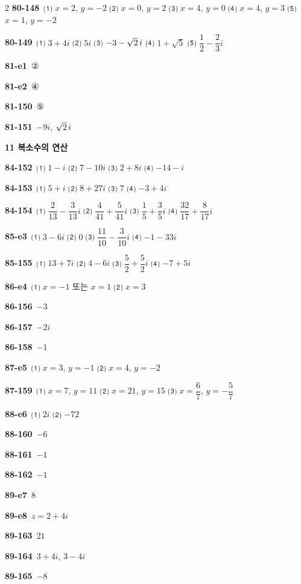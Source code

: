 \documentclass[10pt,a4paper]{article}
\begin{document}
\begin{multicols}{2}
\noindent\textbf{80-148}\ ⑴ $x=2$, $y=-2$ ⑵ $x=0$, $y=2$ ⑶ $x=4$, $y=0$ ⑷ $x=4$, $y=3$ ⑸ $x=1$, $y=-2$\par
\noindent\textbf{80-149}\ ⑴ $3+4i$ ⑵ $5i$ ⑶ $-3-\sqrt{2}\mkern3mu i$ ⑷ $1+\sqrt{5}$ ⑸ $\dfrac{1}{2}-\dfrac{2}{3}i$\par
\noindent\textbf{81-e1}\ ②\par
\noindent\textbf{81-e2}\ ④\par
\noindent\textbf{81-150}\ ⑤\par
\noindent\textbf{81-151}\ $-9i$, $\sqrt{2}\mkern3mu i$\par
\noindent\textbf{11 복소수의 연산}\par\smallskip
\noindent\textbf{84-152}\ ⑴ $1-i$ ⑵ $7-10i$ ⑶ $2+8i$ ⑷ $-14-i$\par
\noindent\textbf{84-153}\ ⑴ $5+i$ ⑵ $8+27i$ ⑶ $7$ ⑷ $-3+4i$\par
\noindent\textbf{84-154}\ ⑴ $\dfrac{2}{13}-\dfrac{3}{13}i$ ⑵ $\dfrac{4}{41}+\dfrac{5}{41}i$ ⑶ $\dfrac{1}{5}+\dfrac{3}{5}i$ ⑷ $\dfrac{32}{17}+\dfrac{8}{17}i$\par
\noindent\textbf{85-e3}\ ⑴ $3-6i$ ⑵ $0$ ⑶ $\dfrac{11}{10}-\dfrac{3}{10}i$ ⑷ $-1-33i$\par
\noindent\textbf{85-155}\ ⑴ $13+7i$ ⑵ $4-6i$ ⑶ $\dfrac{5}{2}+\dfrac{5}{2}i$ ⑷ $-7+5i$\par
\noindent\textbf{86-e4}\ ⑴ $x=-1$ 또는 $x=1$ ⑵ $x=3$\par
\noindent\textbf{86-156}\ $-3$\par
\noindent\textbf{86-157}\ $-2i$\par
\noindent\textbf{86-158}\ $-1$\par
\noindent\textbf{87-e5}\ ⑴ $x=3$, $y=-1$ ⑵ $x=4$, $y=-2$\par
\noindent\textbf{87-159}\ ⑴ $x=7$, $y=11$ ⑵ $x=21$, $y=15$ ⑶ $x=\dfrac{6}{7}$, $y=-\dfrac{5}{7}$\par
\noindent\textbf{88-e6}\ ⑴ $2i$ ⑵ $-72$\par
\noindent\textbf{88-160}\ $-6$\par
\noindent\textbf{88-161}\ $-1$\par
\noindent\textbf{88-162}\ $-1$\par
\noindent\textbf{89-e7}\ $8$\par
\noindent\textbf{89-e8}\ $z=2+4i$\par
\noindent\textbf{89-163}\ $21$\par
\noindent\textbf{89-164}\ $3+4i$, $3-4i$\par
\noindent\textbf{89-165}\ $-8$\par

\end{multicols}
\end{document}
